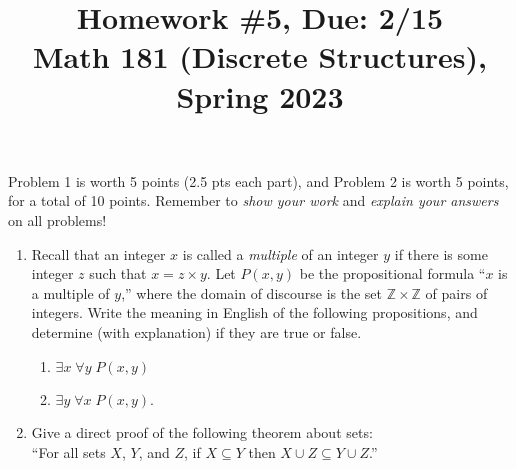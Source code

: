 \documentclass[11pt]{article}
\title{Homework \#5, Due: 2/15 \\Math 181 (Discrete Structures), Spring 2023}
\date{}
\begin{document}
\maketitle

\thispagestyle{empty}

\vspace{-1cm}

Problem 1 is worth 5 points (2.5 pts each part), and Problem 2 is worth 5 points, for a total of 10 points. Remember to \emph{show your work} and \emph{explain your answers} on all problems!

\begin{enumerate}
\item Recall that an integer $x$ is called a \emph{multiple} of an integer $y$ if there is some integer $z$ such that $x = z \times y$. Let $P(x,y)$ be the propositional formula ``$x$ is a multiple of $y$,'' where the domain of discourse is the set $\mathbb{Z}\times \mathbb{Z}$ of pairs of integers. Write the meaning in English of the following propositions, and determine (with explanation) if they are true or false.
\begin{enumerate}
\item $\exists x \; \forall y \; P(x,y)$
\item $\exists y \; \forall x \; P(x,y)$.
\end{enumerate}

\item Give a direct proof of the following theorem about sets: \\ ``For all sets $X$, $Y$, and $Z$, if $X\subseteq Y$ then $X\cup Z \subseteq Y \cup Z$.''
\end{enumerate}
\end{document}
